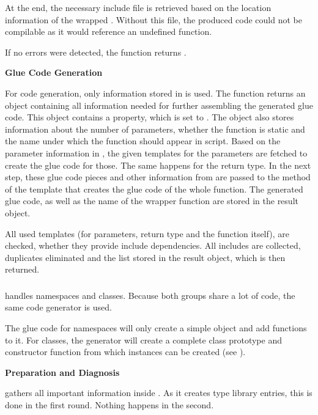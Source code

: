 At the end, the necessary include file is retrieved based on the location information of the wrapped . Without this file, the produced code could not be compilable as it would reference an undefined function.

If no errors were detected, the function returns .

\textbf{Glue Code Generation}

For code generation, only information stored in  is used. The  function returns an object containing all information needed for further assembling the generated glue code. This object contains a  property, which is set to . The object also stores information about the number of parameters, whether the function is static and the name under which the function should appear in script. Based on the parameter information in , the given templates for the parameters are fetched to create the glue code for those. The same happens for the return type. In the next step, these glue code pieces and other information from  are passed to the  method of the template that creates the glue code of the whole function. The generated glue code, as well as the name of the wrapper function are stored in the result object.

All used templates (for parameters, return type and the function itself), are  checked, whether they provide include dependencies. All includes are collected, duplicates eliminated and the list stored in the result object, which is then returned.

\subsubsection{}

 handles namespaces and classes. Because both groups share a lot of code, the same code generator is used.

The glue code for namespaces will only create a simple  object and add functions to it. For classes, the generator will create a complete  class prototype and constructor function from which instances can be created (see ). 

\textbf{Preparation and Diagnosis}

 gathers all important information inside \linebreak{}. As it creates type library entries, this is done in the first round. Nothing happens in the second.

